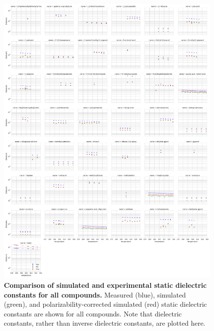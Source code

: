 \documentclass[aps,pre,twocolumn,nofootinbib,superscriptaddress,linenumbers]{revtex4-1}
\begin{document}
\begin{figure}

\includegraphics[width=\textwidth]{./figures/dielectric_versus_temperature_all.pdf}

\caption{{\bf Comparison of simulated and experimental static dielectric constants for all compounds.}
Measured (blue), simulated (green), and polarizability-corrected simulated (red) static dielectric constants are shown for all compounds.
Note that dielectric constants, rather than inverse dielectric constants, are plotted here.
}
\label{figure:AllDielectrics}

\end{figure}

\end{document}
